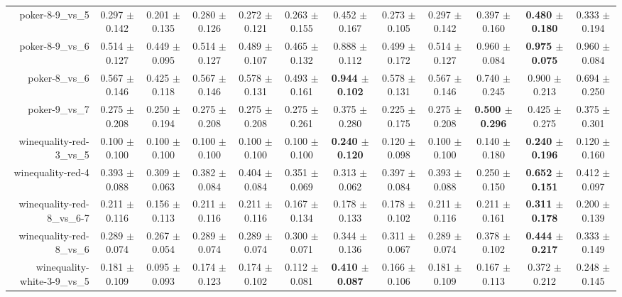 \begin{table}[!ht]
{\begin{tabular}{r c c c c c c c c c c c}
poker-8-9\_vs\_5 & 0.297 $\pm$ 0.142 & 0.201 $\pm$ 0.135 & 0.280 $\pm$ 0.126 & 0.272 $\pm$ 0.121 & 0.263 $\pm$ 0.155 & 0.452 $\pm$ 0.167 & 0.273 $\pm$ 0.105 & 0.297 $\pm$ 0.142 & 0.397 $\pm$ 0.160 & \textbf{0.480 $\pm$ 0.180} & 0.333 $\pm$ 0.194 \\
poker-8-9\_vs\_6 & 0.514 $\pm$ 0.127 & 0.449 $\pm$ 0.095 & 0.514 $\pm$ 0.127 & 0.489 $\pm$ 0.107 & 0.465 $\pm$ 0.132 & 0.888 $\pm$ 0.112 & 0.499 $\pm$ 0.172 & 0.514 $\pm$ 0.127 & 0.960 $\pm$ 0.084 & \textbf{0.975 $\pm$ 0.075} & 0.960 $\pm$ 0.084 \\
poker-8\_vs\_6 & 0.567 $\pm$ 0.146 & 0.425 $\pm$ 0.118 & 0.567 $\pm$ 0.146 & 0.578 $\pm$ 0.131 & 0.493 $\pm$ 0.161 & \textbf{0.944 $\pm$ 0.102} & 0.578 $\pm$ 0.131 & 0.567 $\pm$ 0.146 & 0.740 $\pm$ 0.245 & 0.900 $\pm$ 0.213 & 0.694 $\pm$ 0.250 \\
poker-9\_vs\_7 & 0.275 $\pm$ 0.208 & 0.250 $\pm$ 0.194 & 0.275 $\pm$ 0.208 & 0.275 $\pm$ 0.208 & 0.275 $\pm$ 0.261 & 0.375 $\pm$ 0.280 & 0.225 $\pm$ 0.175 & 0.275 $\pm$ 0.208 & \textbf{0.500 $\pm$ 0.296} & 0.425 $\pm$ 0.275 & 0.375 $\pm$ 0.301 \\
winequality-red-3\_vs\_5 & 0.100 $\pm$ 0.100 & 0.100 $\pm$ 0.100 & 0.100 $\pm$ 0.100 & 0.100 $\pm$ 0.100 & 0.100 $\pm$ 0.100 & \textbf{0.240 $\pm$ 0.120} & 0.120 $\pm$ 0.098 & 0.100 $\pm$ 0.100 & 0.140 $\pm$ 0.180 & \textbf{0.240 $\pm$ 0.196} & 0.120 $\pm$ 0.160 \\
winequality-red-4 & 0.393 $\pm$ 0.088 & 0.309 $\pm$ 0.063 & 0.382 $\pm$ 0.084 & 0.404 $\pm$ 0.084 & 0.351 $\pm$ 0.069 & 0.313 $\pm$ 0.062 & 0.397 $\pm$ 0.084 & 0.393 $\pm$ 0.088 & 0.250 $\pm$ 0.150 & \textbf{0.652 $\pm$ 0.151} & 0.412 $\pm$ 0.097 \\
winequality-red-8\_vs\_6-7 & 0.211 $\pm$ 0.116 & 0.156 $\pm$ 0.113 & 0.211 $\pm$ 0.116 & 0.211 $\pm$ 0.116 & 0.167 $\pm$ 0.134 & 0.178 $\pm$ 0.133 & 0.178 $\pm$ 0.102 & 0.211 $\pm$ 0.116 & 0.211 $\pm$ 0.161 & \textbf{0.311 $\pm$ 0.178} & 0.200 $\pm$ 0.139 \\
winequality-red-8\_vs\_6 & 0.289 $\pm$ 0.074 & 0.267 $\pm$ 0.054 & 0.289 $\pm$ 0.074 & 0.289 $\pm$ 0.074 & 0.300 $\pm$ 0.071 & 0.344 $\pm$ 0.136 & 0.311 $\pm$ 0.067 & 0.289 $\pm$ 0.074 & 0.378 $\pm$ 0.102 & \textbf{0.444 $\pm$ 0.217} & 0.333 $\pm$ 0.149 \\
winequality-white-3-9\_vs\_5 & 0.181 $\pm$ 0.109 & 0.095 $\pm$ 0.093 & 0.174 $\pm$ 0.123 & 0.174 $\pm$ 0.102 & 0.112 $\pm$ 0.081 & \textbf{0.410 $\pm$ 0.087} & 0.166 $\pm$ 0.106 & 0.181 $\pm$ 0.109 & 0.167 $\pm$ 0.113 & 0.372 $\pm$ 0.212 & 0.248 $\pm$ 0.145 \\

\end{tabular}}
\end{table}
